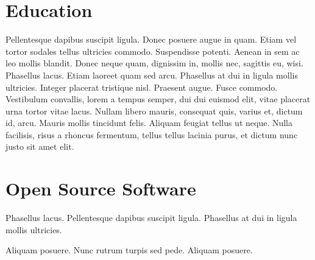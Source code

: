 \documentclass[letterpaper]{jschaf-resume}
\begin{document}
\section{Education}

Pellentesque dapibus suscipit ligula.  Donec posuere augue in quam.  Etiam vel
tortor sodales tellus ultricies commodo.  Suspendisse potenti.  Aenean in sem ac
leo mollis blandit.  Donec neque quam, dignissim in, mollis nec, sagittis eu,
wisi.  Phasellus lacus.  Etiam laoreet quam sed arcu.  Phasellus at dui in
ligula mollis ultricies.  Integer placerat tristique nisl.  Praesent augue.
Fusce commodo.  Vestibulum convallis, lorem a tempus semper, dui dui euismod
elit, vitae placerat urna tortor vitae lacus.  Nullam libero mauris, consequat
quis, varius et, dictum id, arcu.  Mauris mollis tincidunt felis.  Aliquam
feugiat tellus ut neque.  Nulla facilisis, risus a rhoncus fermentum, tellus
tellus lacinia purus, et dictum nunc justo sit amet elit.

\section{Open Source Software}

Phasellus lacus. Pellentesque dapibus suscipit ligula.  Phasellus at dui in
ligula mollis ultricies.

Aliquam posuere. Nunc rutrum turpis sed pede.  Aliquam posuere.


\showbaselinegrid
\end{document}
